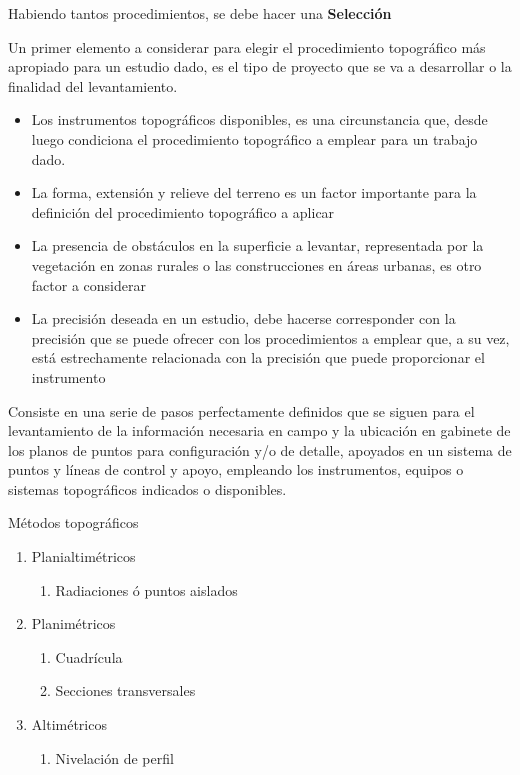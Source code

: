 Habiendo tantos procedimientos, se debe hacer una \textbf{Selección}

Un primer elemento a considerar para elegir el procedimiento topográfico más apropiado para un estudio dado, es el tipo de proyecto que se va a desarrollar o la finalidad del levantamiento.

\begin{itemize}
    \item Los instrumentos topográficos disponibles, es una circunstancia que, desde luego condiciona el procedimiento topográfico a emplear para un trabajo dado.
    \item La forma, extensión y relieve del terreno es un factor importante para la definición del procedimiento topográfico a aplicar
    \item La presencia de obstáculos en la superficie a levantar, representada por la vegetación en zonas rurales o las construcciones en áreas urbanas, es otro factor a considerar
    \item La precisión deseada en un estudio, debe hacerse corresponder con la precisión que se puede ofrecer con los procedimientos a emplear que, a su vez, está estrechamente relacionada con la precisión que puede proporcionar el instrumento
\end{itemize}

\begin{definition}
    Consiste en una serie de pasos perfectamente definidos que se siguen para el levantamiento de la información necesaria en campo y la ubicación en gabinete de los planos de puntos para configuración y/o de detalle, apoyados en un sistema de puntos y líneas de control y apoyo, empleando los instrumentos, equipos o sistemas topográficos indicados o disponibles.
\end{definition}

Métodos topográficos

\begin{enumerate}
    \item Planialtimétricos
    \begin{enumerate}
        \item Radiaciones ó puntos aislados
    \end{enumerate}
    \item Planimétricos
    \begin{enumerate}
        \item Cuadrícula
        \item Secciones transversales
    \end{enumerate}
    \item Altimétricos
    \begin{enumerate}
        \item Nivelación de perfil
    \end{enumerate}
\end{enumerate}


